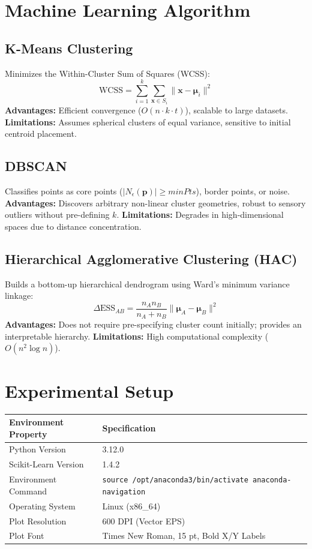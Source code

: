 \documentclass[12pt,a4paper]{article}
\begin{document}
\section{Machine Learning Algorithm}
\subsection{K-Means Clustering}
Minimizes the Within-Cluster Sum of Squares (WCSS):
$$\text{WCSS} = \sum_{i=1}^k \sum_{\mathbf{x} \in S_i} \|\mathbf{x} - \mathbf{\mu}_i\|^2$$
\textbf{Advantages:} Efficient convergence ($O(n \cdot k \cdot t)$), scalable to large datasets. \textbf{Limitations:} Assumes spherical clusters of equal variance, sensitive to initial centroid placement.

\subsection{DBSCAN}
Classifies points as core points ($|N_\epsilon(\mathbf{p})| \ge minPts$), border points, or noise.
\textbf{Advantages:} Discovers arbitrary non-linear cluster geometries, robust to sensory outliers without pre-defining $k$. \textbf{Limitations:} Degrades in high-dimensional spaces due to distance concentration.

\subsection{Hierarchical Agglomerative Clustering (HAC)}
Builds a bottom-up hierarchical dendrogram using Ward's minimum variance linkage:
$$\Delta \text{ESS}_{AB} = \frac{n_A n_B}{n_A + n_B} \|\mathbf{\mu}_A - \mathbf{\mu}_B\|^2$$
\textbf{Advantages:} Does not require pre-specifying cluster count initially; provides an interpretable hierarchy. \textbf{Limitations:} High computational complexity ($O(n^2 \log n)$).

\section{Experimental Setup}
\begin{table}[H]
\centering
\begin{tabular}{ll}
\toprule
\textbf{Environment Property} & \textbf{Specification} \\
\midrule
Python Version & 3.12.0 \\
Scikit-Learn Version & 1.4.2 \\
Environment Command & \texttt{source /opt/anaconda3/bin/activate anaconda-navigation} \\
Operating System & Linux (x86\_64) \\
Plot Resolution & 600 DPI (Vector EPS) \\
Plot Font & Times New Roman, 15 pt, Bold X/Y Labels \\
\bottomrule
\end{tabular}
\end{table}
\end{document}
